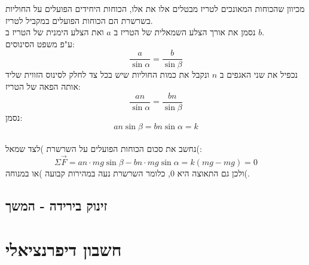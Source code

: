 \documentclass{article}
\begin{document}
מכיוון שהכוחות המאונכים לטריז מבטלים אלו את אלו, הכוחות היחידים הפועלים על החוליות בשרשרת הם הכוחות הפועלים במקביל לטריז.\\
נסמן את אורך הצלע השמאלית של הטריז ב
$a$
ואת הצלע הימנית של הטריז ב
$b$.\\
ע"פ משפט הסינוסים:
\begin{equation*}
    \frac{a}{\sin \alpha} = \frac{b}{\sin \beta}
\end{equation*}
נכפיל את שני האגפים ב
$n$
ונקבל את כמות החוליות שיש בכל צד לחלק לסינוס הזווית שליד אותה הפאה של הטריז:
\begin{equation*}
    \frac{an}{\sin \alpha} = \frac{bn}{\sin \beta}
\end{equation*}
נסמן:
\begin{equation*}
    an\sin{\beta} = bn \sin{\alpha} = k
\end{equation*}
\\
נחשב את סכום הכוחות הפועלים על השרשרת )לצד שמאל(:
\begin{equation*}
    \Sigma{\vec{F}} = an \cdot mg\sin{\beta} - bn \cdot mg\sin{\alpha} = k(mg - mg) = 0
\end{equation*}
ולכן גם התאוצה היא $0$, כלומר השרשרת נעה במהירות קבועה )או במנוחה(.




\newpage
\subsection*{זינוק בירידה - המשך}








\newpage
\section*{חשבון דיפרנציאלי}
\end{document}
